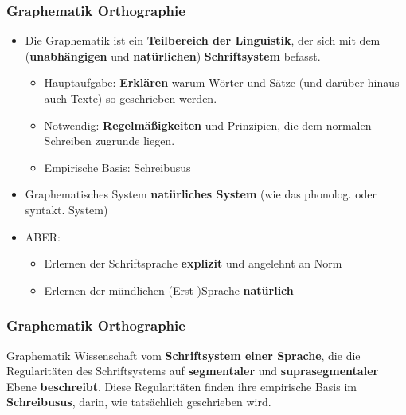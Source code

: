 \begin{frame}
\frametitle{Graphematik \vs Orthographie}

	\begin{itemize}
		\item Die Graphematik ist ein \textbf{Teilbereich der Linguistik}, der sich mit dem (\textbf{unabhängigen} und \textbf{natürlichen}) \textbf{Schriftsystem} befasst.
		
		\begin{itemize}
			\item Hauptaufgabe: \textbf{Erklären} \ras warum Wörter und Sätze (und darüber hinaus auch Texte) so geschrieben werden.
			\item Notwendig: \textbf{Regelmäßigkeiten} und Prinzipien, die dem normalen Schreiben zugrunde liegen.
			\item Empirische Basis: Schreibusus
		\end{itemize}
			
		\item Graphematisches System \ras \textbf{natürliches System} (wie das phonolog. oder syntakt. System)
		\item ABER:
		
		\begin{itemize}
			\item Erlernen der Schriftsprache \ras \textbf{explizit} und angelehnt an Norm
			\item Erlernen der mündlichen (Erst-)Sprache \ras \textbf{natürlich}	
		\end{itemize}
	\end{itemize}
\end{frame}


\begin{frame}
\frametitle{Graphematik \vs Orthographie}

\begin{block}{Graphematik}
	Wissenschaft vom \textbf{Schriftsystem einer Sprache}, die die Regularitäten des Schriftsystems auf \textbf{segmentaler} und \textbf{suprasegmentaler} Ebene \textbf{beschreibt}. Diese Regularitäten finden ihre empirische Basis im \textbf{Schreibusus}, \dash darin, wie tatsächlich geschrieben wird. \citep[vgl.][140]{Duerscheid04a}
\end{block}

\end{frame}


